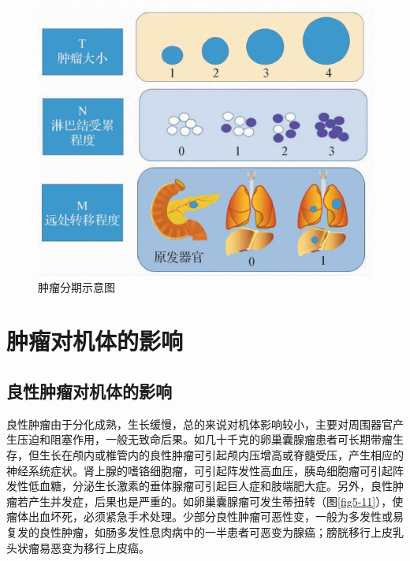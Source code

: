 \begin{figure}[!htbp]
  \centering
  \includegraphics{./images/Image00077.jpg}
  \caption{肿瘤分期示意图}
  \label{fig5-10}
\end{figure}

\section{肿瘤对机体的影响}

\subsection{良性肿瘤对机体的影响}

良性肿瘤由于分化成熟，生长缓慢，总的来说对机体影响较小，主要对周围器官产生压迫和阻塞作用，一般无致命后果。如几十千克的卵巢囊腺瘤患者可长期带瘤生存，但生长在颅内或椎管内的良性肿瘤可引起颅内压增高或脊髓受压，产生相应的神经系统症状。肾上腺的嗜铬细胞瘤，可引起阵发性高血压，胰岛细胞瘤可引起阵发性低血糖，分泌生长激素的垂体腺瘤可引起巨人症和肢端肥大症。另外，良性肿瘤若产生并发症，后果也是严重的。如卵巢囊腺瘤可发生蒂扭转（图\ref{fig5-11}），使瘤体出血坏死，必须紧急手术处理。少部分良性肿瘤可恶性变，一般为多发性或易复发的良性肿瘤，如肠多发性息肉病中的一半患者可恶变为腺癌；膀胱移行上皮乳头状瘤易恶变为移行上皮癌。

